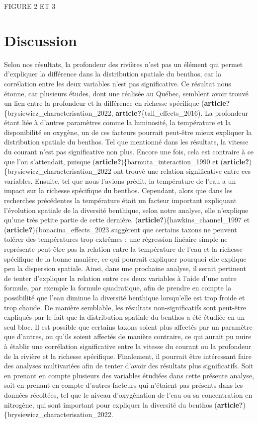 \documentclass[9pt,twocolumn,twoside,]{pnas-new}
\begin{document}
FIGURE 2 ET 3

\section{Discussion}\label{discussion}

Selon nos résultats, la profondeur des rivières n'est pas un élément qui
permet d'expliquer la différence dans la distribution spatiale du
benthos, car la corrélation entre les deux variables n'est pas
significative. Ce résultat nous étonne, car plusieurs études, dont une
réalisée au Québec, semblent avoir trouvé un lien entre la profondeur et
la différence en richesse spécifique
(\textbf{article?}\{brysiewicz\_characterisation\_2022,
\textbf{article?}\{tall\_effects\_2016). La profondeur étant liée à
d'autres paramètres comme la luminosité, la température et la
disponibilité en oxygène, un de ces facteurs pourrait peut-être mieux
expliquer la distribution spatiale du benthos. Tel que mentionné dans
les résultats, la vitesse du courant n'est pas significative non plus.
Encore une fois, cela est contraire à ce que l'on s'attendait, puisque
(\textbf{article?})\{barmuta\_interaction\_1990 et
(\textbf{article?})\{brysiewicz\_characterisation\_2022 ont trouvé une
relation significative entre ces variables. Ensuite, tel que nous
l'avions prédit, la température de l'eau a un impact sur la richesse
spécifique du benthos. Cependant, alors que dans les recherches
précédentes la température était un facteur important expliquant
l'évolution spatiale de la diversité benthique, selon notre analyse,
elle n'explique qu'une très petite partie de cette dernière.
(\textbf{article?})\{hawkins\_channel\_1997 et
(\textbf{article?})\{bonacina\_effects\_2023 suggèrent que certains
taxons ne peuvent tolérer des températures trop extrêmes : une
régression linéaire simple ne représente peut-être pas la relation entre
la température de l'eau et la richesse spécifique de la bonne manière,
ce qui pourrait expliquer pourquoi elle explique peu la dispersion
spatiale. Ainsi, dans une prochaine analyse, il serait pertinent de
tenter d'expliquer la relation entre ces deux variables à l'aide d'une
autre formule, par exemple la formule quadratique, afin de prendre en
compte la possibilité que l'eau diminue la diversité benthique
lorsqu'elle est trop froide et trop chaude. De manière semblable, les
résultats non-significatifs sont peut-être expliqués par le fait que la
distribution spatiale du benthos a été étudiée en un seul bloc. Il est
possible que certains taxons soient plus affectés par un paramètre que
d'autres, ou qu'ils soient affectés de manière contraire, ce qui aurait
pu nuire à établir une corrélation significative entre la vitesse du
courant ou la profondeur de la rivière et la richesse spécifique.
Finalement, il pourrait être intéressant faire des analyses multivariées
afin de tenter d'avoir des résultats plus significatifs. Soit en prenant
en compte plusieurs des variables étudiées dans cette présente analyse,
soit en prenant en compte d'autres facteurs qui n'étaient pas présents
dans les données récoltées, tel que le niveau d'oxygénation de l'eau ou
sa concentration en nitrogène, qui sont important pour expliquer la
diversité du benthos
(\textbf{article?})\{brysiewicz\_characterisation\_2022.
\end{document}
